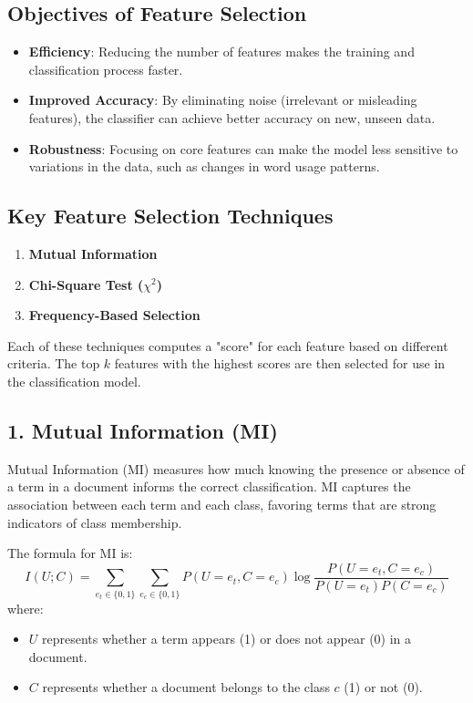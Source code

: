\documentclass{article}
\begin{document}
\subsection*{Objectives of Feature Selection}
\begin{itemize}
    \item \textbf{Efficiency}: Reducing the number of features makes the training and classification process faster.
    \item \textbf{Improved Accuracy}: By eliminating noise (irrelevant or misleading features), the classifier can achieve better accuracy on new, unseen data.
    \item \textbf{Robustness}: Focusing on core features can make the model less sensitive to variations in the data, such as changes in word usage patterns.
\end{itemize}

\subsection*{Key Feature Selection Techniques}
\begin{enumerate}
    \item \textbf{Mutual Information}
    \item \textbf{Chi-Square Test ($\chi^2$)}
    \item \textbf{Frequency-Based Selection}
\end{enumerate}

Each of these techniques computes a "score" for each feature based on different criteria. The top $k$ features with the highest scores are then selected for use in the classification model.

\subsection*{1. Mutual Information (MI)}

Mutual Information (MI) measures how much knowing the presence or absence of a term in a document informs the correct classification. MI captures the association between each term and each class, favoring terms that are strong indicators of class membership.

The formula for MI is:
\[
I(U; C) = \sum_{e_t \in \{0,1\}} \sum_{e_c \in \{0,1\}} P(U = e_t, C = e_c) \log \frac{P(U = e_t, C = e_c)}{P(U = e_t) P(C = e_c)}
\]
where:
\begin{itemize}
    \item $U$ represents whether a term appears (1) or does not appear (0) in a document.
    \item $C$ represents whether a document belongs to the class $c$ (1) or not (0).
\end{itemize}
\end{document}
